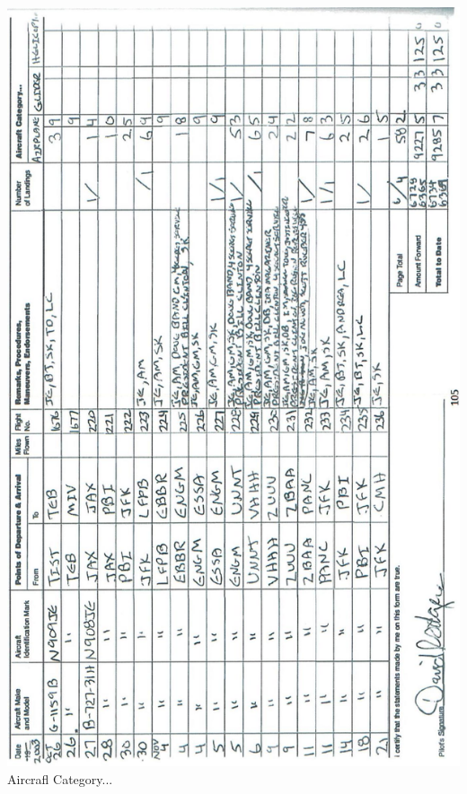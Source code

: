\documentclass[10pt]{article}
\begin{document}
\includegraphics[max width=\textwidth, center]{2025_02_27_dd68c3d38de88f0516d9g-109}\\
Aircrafl Category...\\
\end{document}
